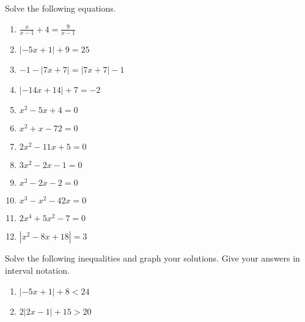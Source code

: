 \documentclass{article}
\begin{document}
\ReviewTitle[class={College Algebra}, for={Test 1}]

Solve the following equations.

\begin{enumerate}
\item $\displaystyle\frac{x}{x - 1} + 4 = \displaystyle\frac{9}{x - 1}$ \vspace{4cm}

\item $|-5x + 1| + 9 = 25$ \vspace{4cm}

\item $-1 - |7x + 7| = |7x + 7| - 1$ \vspace{4cm}

\item $|-14x + 14| + 7 = -2$ \vspace{4cm}

\newpage

\item $x^2 - 5x + 4 = 0$

   \vspace{4cm}

\item $x^2 + x - 72 = 0$

   \vspace{4cm}

\item $2x^2 - 11x + 5 = 0$

   \vspace{4cm}

\item $3x^2 - 2x - 1 = 0$

   \vspace{4cm}

\item 

$x^2 - 2x - 2 = 0$

   \vspace{4cm}

\newpage

\item $x^3 - x^2 - 42x = 0$

   \vspace{4cm}

\item $2x^4 + 5x^2 - 7 = 0$

   \vspace{4cm}

\item $|x^2 - 8x + 18| = 3$

   \vspace{4cm}
\end{enumerate}

Solve the following inequalities and graph your solutions. Give your answers in interval notation.

\begin{enumerate}
\item $|-5x + 1| + 8 < 24$ \vspace{4cm}

\item $2|2x - 1| + 15 > 20$
\end{enumerate}
\end{document}
